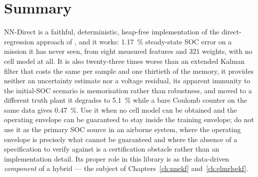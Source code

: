 \section{Summary}
NN-Direct is a faithful, deterministic, heap-free implementation of the direct-regression approach
of \citet{chemali2018dnn}, and it works: \SI{1.17}{\percent} steady-state SOC error on a mission it
has never seen, from eight measured features and $\num{321}$ weights, with no cell model at all.
It is also twenty-three times worse than an extended Kalman filter that costs the same per sample
and one thirtieth of the memory, it provides neither an uncertainty estimate nor a voltage residual,
its apparent immunity to the initial-SOC scenario is memorisation rather than robustness, and moved
to a different truth plant it degrades to \SI{5.1}{\percent} while a bare Coulomb counter on the
same data gives \SI{0.47}{\percent}.  Use it when no cell model can be obtained and the operating
envelope can be guaranteed to stay inside the training envelope; do not use it as the primary SOC
source in an airborne system, where the operating envelope is precisely what cannot be guaranteed
and where the absence of a specification to verify against is a certification obstacle rather than
an implementation detail.  Its proper role in this library is as the data-driven \emph{component}
of a hybrid --- the subject of Chapters~\ref{ch:nnekf} and~\ref{ch:elmrlsekf}.

